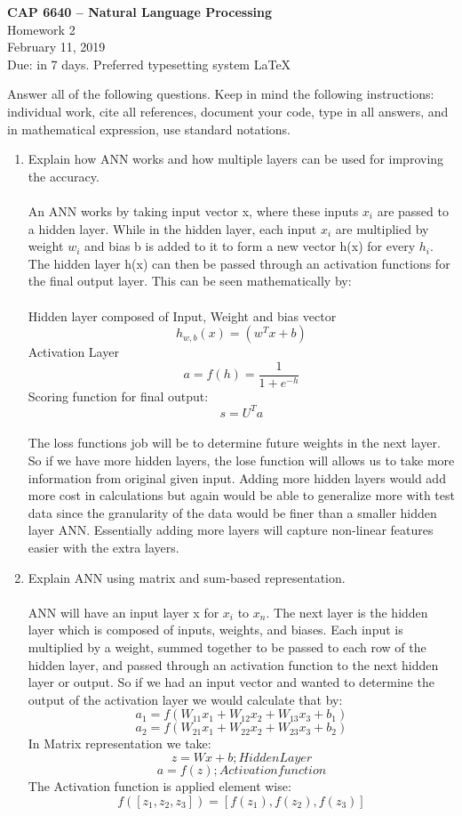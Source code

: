 \documentclass[12pt]{article}
\begin{document}
\begin{center}
    {\bf CAP 6640 -- Natural Language Processing}\\
    Homework 2\\
February 11, 2019\\
Due: in 7 days. Preferred typesetting system \LaTeX
\end{center}

Answer all of the following questions.  Keep in mind the following instructions: individual work, cite all references, document your code, type in all answers, and in mathematical expression, use standard notations.

\begin{enumerate}
    \item Explain how ANN works and how multiple layers can be used for improving the accuracy.\\\\
 An ANN works by taking input vector x, where these inputs $x_{i} $ are passed to a hidden layer. While in the hidden layer, each input $x_{i} $  are multiplied by weight $w_{i} $ and bias b is added to it to form a new vector h(x) for every $h_{i} $. The hidden layer h(x) can then be passed through an activation functions for the final output layer. This can be seen mathematically by: \\\\
 Hidden layer composed of Input, Weight and bias vector
 $$ h_{w,b}(x) = (w^{T}x+b) $$
  Activation Layer
 $$ a = f(h) = \frac{1}{1+e^{-h}} $$
 Scoring function for final output:
 $$ s = U^{T}a $$ \\
 The loss functions job will be to determine future weights in the next layer. So if we have more hidden layers, the lose function will allows us to take more information from original given input. Adding more hidden layers would add more cost in calculations but again would be able to generalize more with test data since the granularity of the data would be finer than a smaller hidden layer ANN. Essentially adding more layers will capture non-linear features easier with the extra layers.
 
    \item Explain ANN using matrix and sum-based representation. \\\\
ANN will have an input layer x for $ x_{i}$ to $ x_{n}$. The next layer is the hidden layer which is composed of inputs, weights, and biases. Each input is multiplied by a weight, summed together to be passed to each row of the hidden layer, and passed through an activation function to the next hidden layer or output. So if we had an input vector and wanted to determine the output of the activation layer we would calculate that by: $$ a_{1} = f(W_{11}x_{1}+W_{12}x_{2}+W_{13}x_{3}+b_{1})$$ 
$$a_{2} = f(W_{21}x_{1}+W_{22}x_{2}+W_{23}x_{3}+b_{2})$$
In Matrix representation we take:
$$ z = Wx + b ; Hidden Layer$$ 
$$ a = f(z) ; Activation function $$
The Activation function is applied element wise:
$$ f([z_{1},z_{2},z_{3}]) = [f(z_{1}),f(z_{2}), f(z_{3})]$$
    

\end{enumerate}
\end{document}
